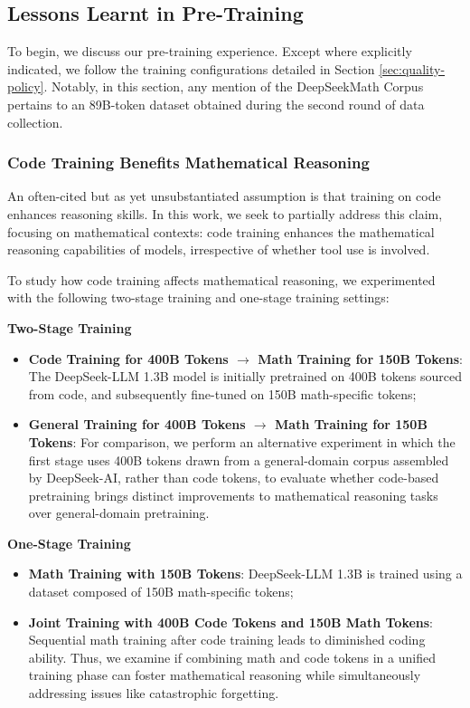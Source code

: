 \subsection{Lessons Learnt in Pre-Training}

To begin, we discuss our pre-training experience. Except where explicitly indicated, we follow the training configurations detailed in Section \ref{sec:quality-policy}. Notably, in this section, any mention of the DeepSeekMath Corpus pertains to an 89B-token dataset obtained during the second round of data collection.

\subsubsection{Code Training Benefits Mathematical Reasoning}

An often-cited but as yet unsubstantiated assumption is that training on code enhances reasoning skills. In this work, we seek to partially address this claim, focusing on mathematical contexts: code training enhances the mathematical reasoning capabilities of models, irrespective of whether tool use is involved.

To study how code training affects mathematical reasoning, we experimented with the following two-stage training and one-stage training settings:

\textbf{Two-Stage Training}

\begin{itemize}[topsep=0pt]
    \item \textbf{Code Training for 400B Tokens $\rightarrow$ Math Training for 150B Tokens}: The DeepSeek-LLM 1.3B model is initially pretrained on 400B tokens sourced from code, and subsequently fine-tuned on 150B math-specific tokens;
    \item \textbf{General Training for 400B Tokens $\rightarrow$ Math Training for 150B Tokens}: For comparison, we perform an alternative experiment in which the first stage uses 400B tokens drawn from a general-domain corpus assembled by DeepSeek-AI, rather than code tokens, to evaluate whether code-based pretraining brings distinct improvements to mathematical reasoning tasks over general-domain pretraining.
\end{itemize}

\textbf{One-Stage Training}

\begin{itemize}[topsep=0pt]
    \item \textbf{Math Training with 150B Tokens}: DeepSeek-LLM 1.3B is trained using a dataset composed of 150B math-specific tokens;
    \item \textbf{Joint Training with 400B Code Tokens and 150B Math Tokens}: Sequential math training after code training leads to diminished coding ability. Thus, we examine if combining math and code tokens in a unified training phase can foster mathematical reasoning while simultaneously addressing issues like catastrophic forgetting.
\end{itemize}

